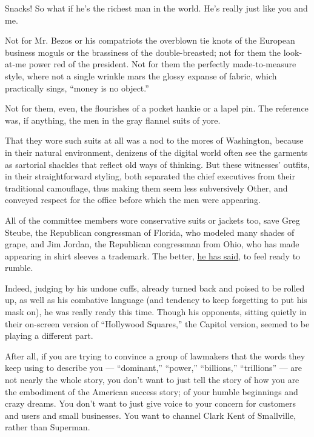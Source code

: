 Snacks! So what if he's the richest man in the world. He's really just
like you and me.

Not for Mr. Bezos or his compatriots the overblown tie knots of the
European business moguls or the brassiness of the double-breasted; not
for them the look-at-me power red of the president. Not for them the
perfectly made-to-measure style, where not a single wrinkle mars the
glossy expanse of fabric, which practically sings, ``money is no
object.''

Not for them, even, the flourishes of a pocket hankie or a lapel pin.
The reference was, if anything, the men in the gray flannel suits of
yore.

That they wore such suits at all was a nod to the mores of Washington,
because in their natural environment, denizens of the digital world
often see the garments as sartorial shackles that reflect old ways of
thinking. But these witnesses' outfits, in their straightforward
styling, both separated the chief executives from their traditional
camouflage, thus making them seem less subversively Other, and conveyed
respect for the office before which the men were appearing.

All of the committee members wore conservative suits or jackets too,
save Greg Steube, the Republican congressman of Florida, who modeled
many shades of grape, and Jim Jordan, the Republican congressman from
Ohio, who has made appearing in shirt sleeves a trademark. The better,
\href{https://soundcloud.com/user-671880160/jim-jordan-talks-oversight-in-the-minority-why-he-doesnt-wear-a-jacket}{he
has said}, to feel ready to rumble.

Indeed, judging by his undone cuffs, already turned back and poised to
be rolled up, as well as his combative language (and tendency to keep
forgetting to put his mask on), he was really ready this time. Though
his opponents, sitting quietly in their on-screen version of ``Hollywood
Squares,'' the Capitol version, seemed to be playing a different part.

After all, if you are trying to convince a group of lawmakers that the
words they keep using to describe you --- ``dominant,'' ``power,''
``billions,'' ``trillions'' --- are not nearly the whole story, you
don't want to just tell the story of how you are the embodiment of the
American success story; of your humble beginnings and crazy dreams. You
don't want to just give voice to your concern for customers and users
and small businesses. You want to channel Clark Kent of Smallville,
rather than Superman.

